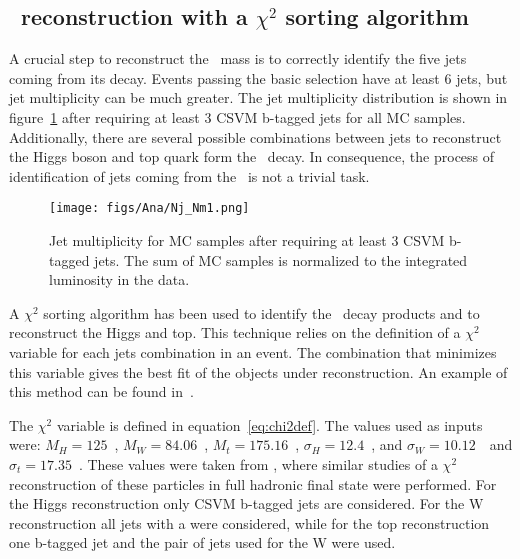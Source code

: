 \subsection{\Tp~reconstruction with a $\chi^{2}$ sorting algorithm}
\label{sec:chi2}

A crucial step to reconstruct the \Tp~mass is to correctly identify the five jets coming from its decay. Events passing the basic selection have at least 6 jets, but jet multiplicity can be much greater. The jet multiplicity distribution is shown in figure~\ref{fig:Nj} after requiring at least 3 CSVM b-tagged jets for all MC samples. Additionally, there are several possible combinations between jets to reconstruct the Higgs boson and top quark form the \Tp~decay. In consequence, the process of identification of jets coming from the \Tp~is not a trivial task. 

\begin{figure}[!Hhtbp]
  \begin{center}
    \texttt{[image: figs/Ana/Nj\_Nm1.png]}
    \caption{Jet multiplicity for MC samples after requiring at least 3 CSVM b-tagged jets. The sum of MC samples is normalized to the integrated luminosity in the data.}
    \label{fig:Nj}
  \end{center}
\end{figure}

A $\chi^{2}$ sorting algorithm has been used to identify the \Tp~decay products and to reconstruct the Higgs and top. This technique relies on the definition of a $\chi^{2}$ variable for each jets combination in an event. The combination that minimizes this variable gives the best fit of the objects under reconstruction. An example of this method can be found in~\cite{Brochet:1956723}. 

The $\chi^{2}$ variable is defined in equation~\ref{eq:chi2def}. The values used as inputs were: $M_{H}=125$~\GeVcc, $M_{W}=84.06$~\GeVcc, $M_{t}=175.16$~\GeVcc, $\sigma_{H}=12.4$~\GeVcc, and $\sigma_{W}=10.12$~\GeVcc~and $\sigma_{t}=17.35$~\GeVcc. These values were taken from \cite{Brochet:1956723,Chatrchyan:2013zna}, where similar studies of a $\chi^{2}$ reconstruction of these particles in full hadronic final state were performed. For the Higgs reconstruction only CSVM b-tagged jets are considered. For the W reconstruction all jets with a  were considered, while for the top reconstruction one b-tagged jet and the pair of jets used for the W were used. %

